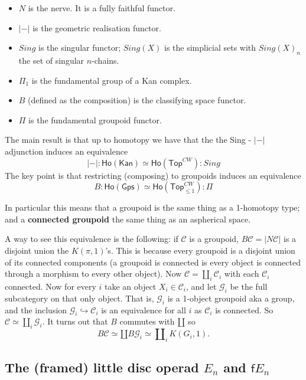 \documentclass[11pt]{article}
\newcommand{\C}{\mathcal{C}}
\theoremstyle{definition}
\begin{document}
\begin{itemize}
    \item $N$ is the nerve. It is a fully faithful functor.
    \item $|-|$ is the geometric realisation functor.
    \item $Sing$ is the singular functor; $Sing(X)$ is the simplicial sets with $Sing(X)_n$ the set of singular $n$-chains.
    \item $\Pi_1$ is the fundamental group of a Kan complex.
    \item  $B$ (defined as the composition) is the classifying space functor.
    \item $\Pi$ is the fundamental groupoid functor.
\end{itemize}


The main result is that up to homotopy we have that the the Sing - $|-|$ adjunction induces an equivalence $$ |-|:  \mathsf{Ho}(\mathsf{Kan}) \simeq \mathsf{Ho}(\mathsf{Top}^{CW}) : Sing$$
The key point is that restricting (composing) to groupoids induces an equivalence $$ B: \mathsf{Ho}(\mathsf{Gps}) \simeq \mathsf{Ho}(\mathsf{Top}^{CW}_{\leq 1}) : \Pi$$

In particular this means that a groupoid is the same thing as a 1-homotopy type; and a \textbf{connected groupoid }the same thing as an aspherical space.

A way to see this equivalence is the following: if $\C$ is a groupoid, $B \C = |N \C|$ is a disjoint union the $K(\pi,1)$'s. This is because every groupoid is a disjoint union of its connected components (a groupoid is connected is every object is connected through a morphism to every other object). Now $\C = \amalg_i \C_i$ with each $\C_i$ connected. Now for every $i$ take an object $X_i \in \C_i$, and let $\mathcal{G}_i$ be the full subcategory on that only object. That is, $\mathcal{G}_i$ is a 1-object groupoid aka a group, and the inclusion $\mathcal{G}_i \hookrightarrow \C_i$ is an equivalence for all $i$ as $\C_i$ is connected. So $\C \simeq \amalg_i \mathcal{G}_i$. It turns out that $B$ commutes with $\amalg$ so $$B \C \simeq \amalg B\mathcal{G}_i \simeq \amalg_i K(G_i,1 ).$$


\subsection{The (framed) little disc operad $E_n$ and $\mathsf{f}E_n$} 
\end{document}
